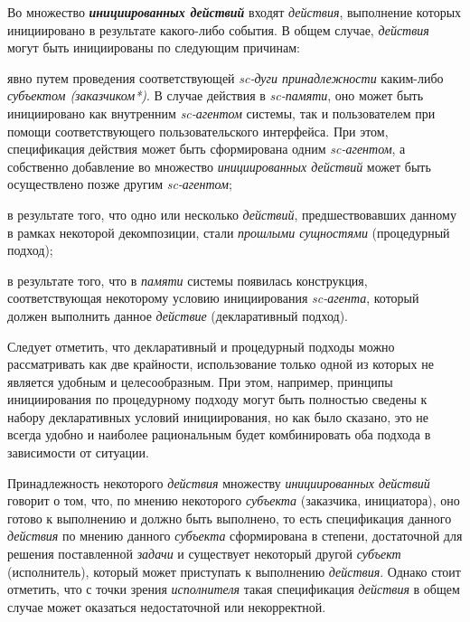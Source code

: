 Во множество \textbf{\textit{инициированных действий}} входят \textit{действия}, выполнение которых инициировано в результате какого-либо события.
В общем случае, \textit{действия} могут быть инициированы по следующим причинам:
\begin{textitemize}
	\item явно путем проведения соответствующей \textit{sc-дуги принадлежности} каким-либо \textit{субъектом (заказчиком*)}. В случае действия в \textit{sc-памяти}, оно может быть инициировано как внутренним \textit{sc-агентом} системы, так и пользователем при помощи соответствующего пользовательского интерфейса. При этом, спецификация действия может быть сформирована одним \textit{sc-агентом}, а собственно добавление во множество \textit{инициированных действий} может быть осуществлено позже другим \textit{sc-агентом};
	\item в результате того, что одно или несколько \textit{действий}, предшествовавших данному в рамках некоторой декомпозиции, стали \textit{прошлыми сущностями} (процедурный подход);
	\item в результате того, что в \textit{памяти} системы появилась конструкция, соответствующая некоторому условию инициирования \textit{sc-агента}, который должен выполнить данное \textit{действие} (декларативный подход).
\end{textitemize}

Следует отметить, что декларативный и процедурный подходы можно рассматривать как две крайности, использование только одной из которых не является удобным и целесообразным. При этом, например, принципы инициирования по процедурному подходу могут быть полностью сведены к набору декларативных условий инициирования, но как было сказано, это не всегда удобно и наиболее рациональным будет комбинировать оба подхода в зависимости от ситуации.

Принадлежность некоторого \textit{действия} множеству \textit{инициированных действий} говорит о том, что, по мнению некоторого \textit{субъекта} (заказчика, инициатора), оно готово к выполнению и должно быть выполнено, то есть спецификация данного \textit{действия} по мнению данного \textit{субъекта} сформирована в степени, достаточной для решения поставленной \textit{задачи} и существует некоторый другой \textit{субъект} (исполнитель), который может приступать к выполнению \textit{действия}. Однако стоит отметить, что с точки зрения \textit{исполнителя} такая спецификация \textit{действия} в общем случае может оказаться недостаточной или некорректной.


